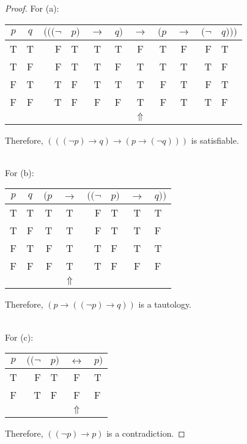 \documentclass[12pt,a4paper]{article}
\theoremstyle{plain}
\begin{document}
\begin{proof}
For (a):
\begin{center}
\begin{tabular}{cc||rlclcrcrl}
$p$ & $q$ & $( ( ( \neg$ & $p )$ & $\rightarrow$ & $q )$ & $\rightarrow$ & $( p$ & $\rightarrow$ & $( \neg$ &  $q ) ) )$ \\
\hline
T & T & F & T & T & T & F & T & F & F & T \\
T & F & F & T & T & F & T & T & T & T & F \\
F & T & T & F & T & T & T & F & T & F & T \\
F & F & T & F & F & F & T & F & T & T & F \\
  &   &  &   &  &   & $\Uparrow$ & &  & & 
\end{tabular}
\end{center}
%
Therefore, $( ( ( \neg p ) \rightarrow q ) \rightarrow ( p \rightarrow ( \neg q ) ) )$ is satisfiable.

\ \\
For (b):
\begin{center}
\begin{tabular}{cc||rcrlcl}
$p$ & $q$ & $( p$ & $\rightarrow$ & $( ( \neg$ & $p )$ & $\rightarrow$ &  $q ) )$ \\
\hline
T & T & T & T & F & T & T & T \\
T & F & T & T & F & T & T & F \\
F & T & F & T & T & F & T & T \\
F & F & F & T & T & F & F & F \\
  &   &  & $\Uparrow$  &  &   &  & 
\end{tabular}
\end{center}
%
Therefore, $( p \rightarrow ( ( \neg p ) \rightarrow q ) )$ is a tautology.

\ \\
For (c):
\begin{center}
\begin{tabular}{c||rlcl}
$p$ & $( ( \neg$ & $p )$ & $\leftrightarrow$ & $p )$ \\
\hline
T & F & T & F & T \\
F & T & F & F & F \\
& & & $\Uparrow$ &
\end{tabular}
\end{center} 
%
Therefore, $( ( \neg p ) \rightarrow p )$ is a contradiction.
\end{proof}
\end{document}
